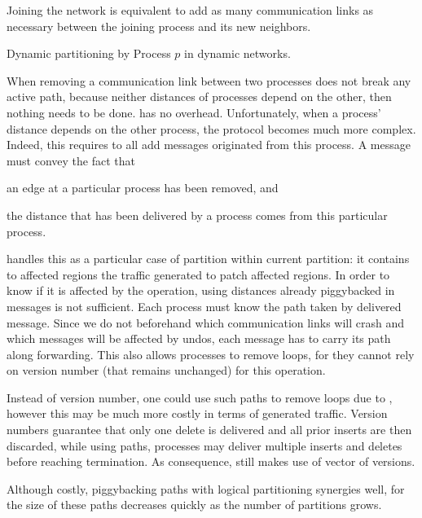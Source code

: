 \noindent Joining the network is equivalent to add as many
communication links as necessary between the joining process and its
new neighbors.

\begin{algorithm}
  
  \caption{\label{algo:edges}Dynamic partitioning by Process $p$ in dynamic networks.}
\end{algorithm}



When removing a communication link between two processes does not
break any active path, because neither distances of processes depend
on the other, then nothing needs to be done. \NAME has no overhead.
Unfortunately, when a process' distance depends on the other process,
the protocol becomes much more complex. Indeed, this requires to
 all add messages originated from this process. A message
must convey the fact that
\begin{inparaenum}[(i)]
\item an edge at a particular process has been removed, and
\item the distance that has been delivered by a process comes from
  this particular process.
\end{inparaenum}

\noindent \NAME handles this as a particular case of partition within
current partition: it contains to affected regions the traffic
generated to patch affected regions. In order to know if it is
affected by the  operation, using distances already
piggybacked in messages is not sufficient.  Each process must know the
path taken by delivered message. Since we do not beforehand which
communication links will crash and which messages will be affected by
undos, each message has to carry its path along forwarding. This also
allows processes to remove loops, for they cannot rely on version
number (that remains unchanged) for this operation.

\noindent Instead of version number, one could use such paths to remove loops
due to , however this may be much more costly in
terms of generated traffic. Version numbers guarantee that only one
delete is delivered and all prior inserts are then discarded, while
using paths, processes may deliver multiple inserts and deletes before
reaching termination.  As
consequence, \NAME still makes use of vector of versions.

\noindent Although costly, piggybacking paths with logical partitioning synergies
well, for the size of these paths decreases quickly as the number of
partitions grows.

